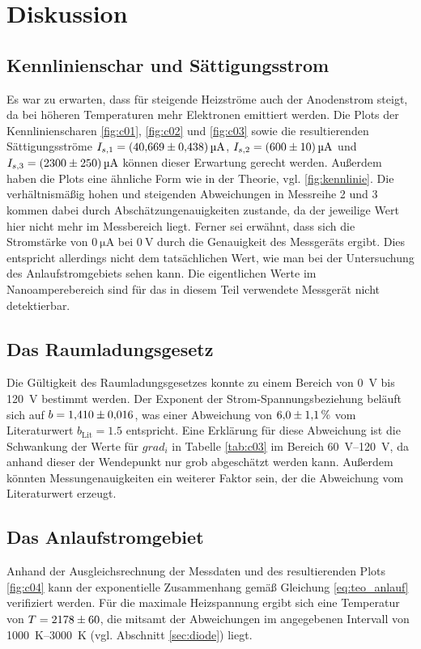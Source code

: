 \section{Diskussion}

\subsection{Kennlinienschar und Sättigungsstrom}
Es war zu erwarten, dass für steigende Heizströme auch der Anodenstrom steigt, da bei höheren Temperaturen mehr
Elektronen emittiert werden.
Die Plots der Kennlinienscharen \ref{fig:c01}, \ref{fig:c02} und \ref{fig:c03} sowie die resultierenden 
Sättigungsströme $I_{s,1} = \qty{40.669 \pm 0.438}{\micro\ampere}$, $I_{s,2} = \qty{600 \pm 10}{\micro\ampere}$ und 
$I_{s,3}= \qty{2300 \pm 250}{\micro\ampere}$ können dieser Erwartung gerecht werden.
Außerdem haben die Plots eine ähnliche Form wie in der Theorie, vgl. \ref{fig:kennlinie}.
Die verhältnismäßig hohen und steigenden Abweichungen in Messreihe 2 und 3 kommen dabei durch Abschätzungenauigkeiten zustande,
da der jeweilige Wert hier nicht mehr im Messbereich liegt.
Ferner sei erwähnt, dass sich die Stromstärke von $\qty[]{0}{\micro\ampere}$ bei $\qty[]{0}{\volt}$ durch die Genauigkeit des 
Messgeräts ergibt.
Dies entspricht allerdings nicht dem tatsächlichen Wert, wie man bei der Untersuchung des Anlaufstromgebiets sehen kann.
Die eigentlichen Werte im Nanoamperebereich sind für das in diesem Teil verwendete Messgerät nicht detektierbar.




\subsection{Das Raumladungsgesetz}
Die Gültigkeit des Raumladungsgesetzes konnte zu einem Bereich von \qty[]{0}{\volt} bis \qty{120}{\volt} bestimmt werden.
Der Exponent der Strom-Spannungsbeziehung beläuft sich auf $b = \num{1.410 \pm 0.016}$, was einer Abweichung von 
$\num{6.0+-1.1}\, \%$ vom Literaturwert $b_\text{Lit} = \num[]{1.5}$ entspricht.
Eine Erklärung für diese Abweichung ist die Schwankung der Werte für $grad_i$ in Tabelle \ref{tab:c03} im Bereich \qtyrange[]{60}{120}{\volt},
da anhand dieser der Wendepunkt nur grob abgeschätzt werden kann.
Außerdem könnten Messungenauigkeiten ein weiterer Faktor sein, der die Abweichung vom Literaturwert erzeugt.



\subsection{Das Anlaufstromgebiet}
Anhand der Ausgleichsrechnung der Messdaten und des resultierenden Plots \ref{fig:c04} kann der exponentielle Zusammenhang gemäß 
Gleichung \eqref{eq:teo_anlauf} verifiziert werden.
Für die maximale Heizspannung ergibt sich eine Temperatur von $T = \num[]{2178 \pm  60}$, die
mitsamt der Abweichungen im angegebenen Intervall von \qtyrange[]{1000}{3000}{\kelvin}
(vgl. Abschnitt \ref{sec:diode}) liegt.

